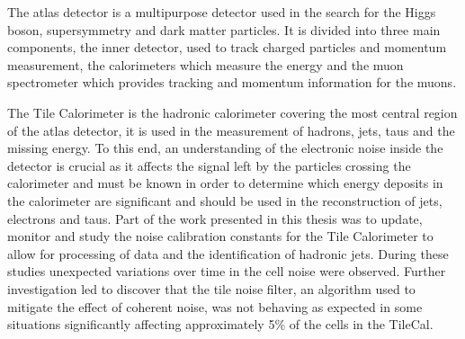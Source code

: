 The \gls{atlas} detector is a multipurpose detector used in the search for the
Higgs boson, supersymmetry and dark matter particles. It is divided into three
main components, the inner detector, used to track charged particles and
momentum measurement, the calorimeters which measure the energy and the muon
spectrometer which provides tracking and momentum information for the muons.

The Tile Calorimeter is the hadronic calorimeter covering the most central
region of the \gls{atlas} detector, it is used in the measurement of hadrons,
jets, taus and the missing energy. To this end, an understanding of the
electronic noise inside the detector is crucial as it affects the signal left by
the particles crossing the calorimeter and must be known in order to determine
which energy deposits in the calorimeter are significant and should be used in
the reconstruction of jets, electrons and taus. Part of the work presented in
this thesis was to update, monitor and study the noise calibration constants for
the Tile Calorimeter to allow for processing of data and the identification of
hadronic jets. During these studies unexpected variations over time in the cell
noise were observed. Further investigation led to discover that the tile noise
filter, an algorithm used to mitigate the effect of coherent noise, was not
behaving as expected in some situations significantly affecting approximately
5\% of the cells in the TileCal.

